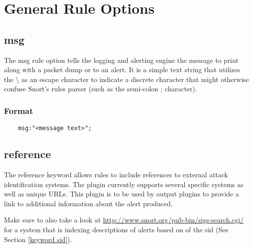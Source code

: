 \documentclass[english]{report}
\begin{document}
\section{General Rule Options}

\subsection{msg}

The msg rule option tells the logging and alerting engine the message to print
along with a packet dump or to an alert. It is a simple text string that
utilizes the \textbackslash{} as an escape character to indicate a discrete
character that might otherwise confuse Snort's rules parser (such as the
semi-colon ; character).

\subsubsection{Format}

\begin{verbatim}
    msg:"<message text>";
\end{verbatim}

\subsection{reference}

The reference keyword allows rules to include references to external attack
identification systems. The plugin currently supports several specific systems
as well as unique URLs. This plugin is to be used by output plugins to provide
a link to additional information about the alert produced.

Make sure to also take a look at
\url{http://www.snort.org/pub-bin/sigs-search.cgi/} for a system that is
indexing descriptions of alerts based on of the sid (See Section \ref{keyword
sid}).
\end{document}
